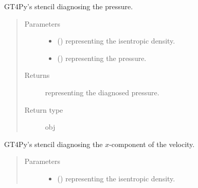 \documentclass[letterpaper,10pt,english]{sphinxmanual}
\begin{document}
\begin{fulllineitems}
\begin{fulllineitems}
\end{fulllineitems}


\begin{fulllineitems}
\label{\detokenize{api:dycore.diagnostic_isentropic.DiagnosticIsentropic._defs_stencil_diagnosing_pressure}}
GT4Py’s stencil diagnosing the pressure.
\begin{quote}\begin{description}
\item[{Parameters}] \leavevmode\begin{itemize}
\item {} 
 () \textendash{}  representing the isentropic density.

\item {} 
 () \textendash{}  representing the pressure.

\end{itemize}

\item[{Returns}] \leavevmode
{} representing the diagnosed pressure.

\item[{Return type}] \leavevmode
obj

\end{description}\end{quote}

\end{fulllineitems}


\begin{fulllineitems}
\label{\detokenize{api:dycore.diagnostic_isentropic.DiagnosticIsentropic._defs_stencil_diagnosing_velocity_x}}
GT4Py’s stencil diagnosing the \(x\)-component of the velocity.
\begin{quote}\begin{description}
\item[{Parameters}] \leavevmode\begin{itemize}
\item {} 
 () \textendash{}  representing the isentropic density.


\end{itemize}
\end{description}
\end{quote}
\end{fulllineitems}
\end{fulllineitems}
\end{document}
